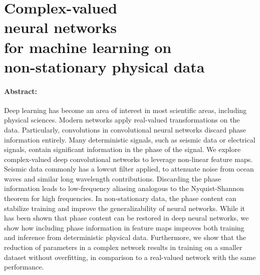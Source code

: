 \section[Complex-valued neural networks for machine learning on non-stationary physical data]{Complex-valued\\neural networks\\for machine learning on\\\hspace*{-2cm}non-stationary physical data}

\paragraph{Abstract:} Deep learning has become an area of interest in most scientific areas, including physical sciences. Modern networks apply real-valued transformations on the data. Particularly, convolutions in convolutional neural networks discard phase information entirely. Many deterministic signals, such as seismic data or electrical signals, contain significant information in the phase of the signal. We explore complex-valued deep convolutional networks to leverage non-linear feature maps. Seismic data commonly has a lowcut filter applied, to attenuate noise from ocean waves and similar long wavelength contributions. Discarding the phase information leads to low-frequency aliasing analogous to the Nyquist-Shannon theorem for high frequencies. In non-stationary data, the phase content can stabilize training and improve the generalizability of neural networks. While it has been shown that phase content can be restored in deep neural networks, we show how including phase information in feature maps improves both training and inference from deterministic physical data. Furthermore, we show that the reduction of parameters in a complex network results in training on a smaller dataset without overfitting, in comparison to a real-valued network with the same performance.


{\vfill\hfill\newline{}}

